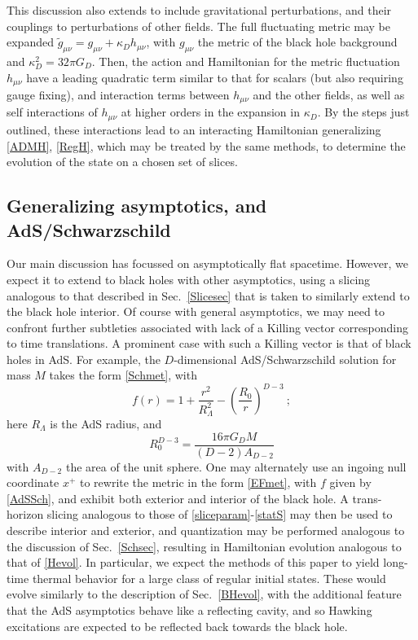 \documentclass[12pt]{article}
\numberwithin{equation}{section}
\newcommand{\beq}{\begin{equation}}
\newcommand{\eeq}{\end{equation}}
\begin{document}
This discussion also extends to include gravitational perturbations, and their couplings to perturbations of other fields.  The full fluctuating metric may be expanded $\tilde g_{\mu\nu} = g_{\mu\nu}+ \kappa_D h_{\mu\nu}$, with $g_{\mu\nu}$ the metric of the black hole background and $\kappa_D^2 =32\pi G_D$.  Then, the action and Hamiltonian for the metric fluctuation $h_{\mu\nu}$ have a leading quadratic term similar to that for scalars (but also requiring gauge fixing), and interaction terms between $h_{\mu\nu}$ and the other fields, as well as self interactions of $h_{\mu\nu}$ at higher orders in the expansion in $\kappa_D$.  By the steps just outlined, these interactions lead to an interacting Hamiltonian generalizing \eqref{ADMH},  \eqref{RegH}, which may be treated by the same methods, to determine the evolution of the state on a chosen set of slices.  

\subsection{Generalizing asymptotics, and AdS/Schwarzschild}

Our main discussion has focussed on asymptotically flat spacetime.  However, we expect it to extend to black holes with other asymptotics, using a slicing analogous to that described in Sec.~\ref{Slicesec} that is taken to similarly extend to the black hole interior.  Of course with general asymptotics, we may need to confront further subtleties associated with lack of a Killing vector corresponding to time translations.  A prominent case with such a Killing vector is that of black holes in AdS.  For example, the $D$-dimensional AdS/Schwarzschild solution for mass $M$ takes the form \eqref{Schmet}, with
\beq\label{AdSSch}
f(r) = 1 + \frac{r^2}{R_\Lambda^2} - \left(\frac{R_0}{r}\right)^{D-3}\ ;
\eeq
here $R_\Lambda$ is the AdS radius, and 
\beq
R_0^{D-3} = \frac{16\pi G_D M}{(D-2)A_{D-2}}
\eeq
with $A_{D-2}$ the area of the unit sphere.  One may alternately use an ingoing null coordinate $x^+$ to rewrite the metric in the form \eqref{EFmet}, with $f$ given by \eqref{AdSSch}, and exhibit both exterior and interior of the black hole.  A trans-horizon slicing analogous to those of \eqref{sliceparam}-\eqref{statS} may then be used to describe interior and exterior, and quantization may be performed analogous to the discussion of Sec.~\ref{Schsec}, resulting in  Hamiltonian evolution analogous to that of \eqref{Hevol}.  In particular, we expect the methods of this paper to yield long-time thermal behavior for a large class of regular initial states.  These would evolve similarly to the description of  Sec.~\ref{BHevol}, with the additional feature that the AdS asymptotics behave like a reflecting cavity, and so Hawking excitations are expected to be reflected back towards the black hole.  
\end{document}
